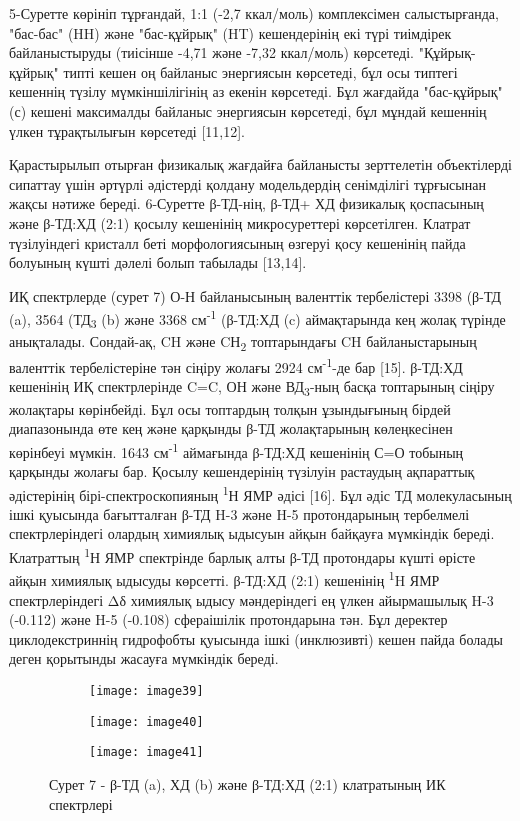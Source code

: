 \begin{multicols}{2}
5-Суретте көрініп тұрғандай, 1:1 (-2,7 ккал/моль) комплексімен
салыстырғанда, "бас-бас" (HH) және "бас-құйрық" (HT) кешендерінің екі
түрі тиімдірек байланыстыруды (тиісінше -4,71 және -7,32 ккал/моль)
көрсетеді. "Құйрық-құйрық" типті кешен оң байланыс энергиясын көрсетеді,
бұл осы типтегі кешеннің түзілу мүмкіншілігінің аз екенін көрсетеді. Бұл
жағдайда "бас-құйрық" (с) кешені максималды байланыс энергиясын
көрсетеді, бұл мұндай кешеннің үлкен тұрақтылығын көрсетеді {[}11,12{]}.

Қарастырылып отырған физикалық жағдайға байланысты зерттелетін
объектілерді сипаттау үшін әртүрлі әдістерді қолдану модельдердің
сенімділігі тұрғысынан жақсы нәтиже береді. 6-Суретте β-ТД-нің, β-ТД+ ХД
физикалық қоспасының және β-ТД:ХД (2:1) қосылу кешенінің микросуреттері
көрсетілген. Клатрат түзілуіндегі кристалл беті морфологиясының өзгеруі
қосу кешенінің пайда болуының күшті дәлелі болып табылады {[}13,14{]}.

ИҚ спектрлерде (сурет 7) О-Н байланысының валенттік тербелістері 3398
(β-ТД (a), 3564 (ТД\textsubscript{3} (b) және 3368
см\textsuperscript{-1} (β-ТД:ХД (c) аймақтарында кең жолақ түрінде
анықталады. Сондай-ақ, CH және CН\textsubscript{2} топтарындағы CH
байланыстарының валенттік тербелістеріне тән сіңіру жолағы 2924
см\textsuperscript{-1}-де бар {[}15{]}. β-ТД:ХД кешенінің ИҚ
спектрлерінде C=C, ОН және ВД\textsubscript{3}-ның басқа топтарының
сіңіру жолақтары көрінбейді. Бұл осы топтардың толқын ұзындығының бірдей
диапазонында өте кең және қарқынды β-ТД жолақтарының көлеңкесінен
көрінбеуі мүмкін. 1643 см\textsuperscript{-1} аймағында β-ТД:ХД
кешенінің С=О тобының қарқынды жолағы бар. Қосылу кешендерінің түзілуін
растаудың ақпараттық әдістерінің бірі-спектроскопияның
\textsuperscript{1}Н ЯМР әдісі {[}16{]}. Бұл әдіс ТД молекуласының ішкі
қуысында бағытталған β-ТД H-3 және H-5 протондарының тербелмелі
спектрлеріндегі олардың химиялық ыдысуын айқын байқауға мүмкіндік
береді. Клатраттың \textsuperscript{1}Н ЯМР спектрінде барлық алты β-ТД
протондары күшті өрісте айқын химиялық ыдысуды көрсетті. β-ТД:ХД (2:1)
кешенінің \textsuperscript{1}H ЯМР спектрлеріндегі Δδ химиялық ыдысу
мәндеріндегі ең үлкен айырмашылық H-3 (-0.112) және H-5 (-0.108)
сфераішілік протондарына тән. Бұл деректер циклодекстриннің гидрофобты
қуысында ішкі (инклюзивті) кешен пайда болады деген қорытынды жасауға
мүмкіндік береді.
\end{multicols}

\begin{figure}[H]
\centering
\begin{subfigure}[b]{0.45\textwidth}
\centering
\texttt{[image: image39]}
\end{subfigure}
\begin{subfigure}[b]{0.45\textwidth}
\centering
\texttt{[image: image40]}
\end{subfigure}
\begin{subfigure}[b]{0.45\textwidth}
\centering
\texttt{[image: image41]}
\end{subfigure}
\caption*{Сурет 7 - β-ТД (a), ХД (b) және β-ТД:ХД (2:1) клатратының ИК спектрлері}
\end{figure}

